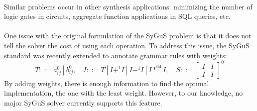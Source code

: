 \paragraph{}
Similar problems occur in other synthesis applications: minimizing the number of logic gates in circuits, aggregate function applications in SQL queries, etc.
%
\paragraph{}
One issue with the original formulation of the SyGuS problem is that it does not tell the solver the cost of using each operation. To address this issue, the SyGuS standard was recently extended to annotate grammar rules with weights:
%
\[
T ::= a_{ij}^0 \ | \ b_{ij}^0, \quad
I ::= T \ | \ I +^1 I \ | \ I -^1 I \ | \ I *^{64} I, \quad
S ::=
\begin{bmatrix} I & I \\
I & I
\end{bmatrix}^0
\]
%
By adding weights, there is enough information to find the optimal implementation, the one with the least weight.
%
However, to our knowledge, no major SyGuS solver currently supports this feature.
